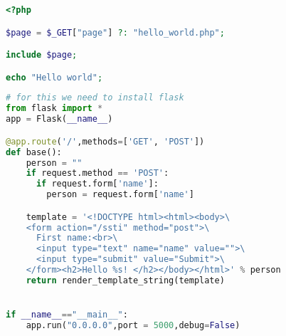 \documentclass[./../main.tex]{subfiles}
\begin{document}
\begin{lstlisting}[language=php, caption=Lỗ hổng Local File Inclusion và Remote File Inclusion, label={src:rfi}]
<?php

$page = $_GET["page"] ?: "hello_world.php";

include $page;

echo "Hello world";

\end{lstlisting}

\begin{lstlisting}[language=python, caption=Lỗ hổng Server-side Template Injection,  label={src:ssti}]
# for this we need to install flask
from flask import *
app = Flask(__name__)

@app.route('/',methods=['GET', 'POST'])
def base():
    person = ""
    if request.method == 'POST':
      if request.form['name']:
        person = request.form['name']

    template = '<!DOCTYPE html><html><body>\
    <form action="/ssti" method="post">\
      First name:<br>\
      <input type="text" name="name" value="">\
      <input type="submit" value="Submit">\
    </form><h2>Hello %s! </h2></body></html>' % person
    return render_template_string(template)


if __name__=="__main__":
	app.run("0.0.0.0",port = 5000,debug=False)

\end{lstlisting}
\end{document}
